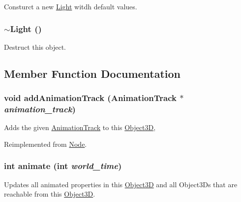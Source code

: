 Consturct a new \hyperlink{classm3g_1_1Light}{Light} witdh default values. \hypertarget{classm3g_1_1Light_f50d3d8cdb323e1a9fbd7bfac3aeba06}{
\subsubsection[{$\sim$Light}]{\setlength{\rightskip}{0pt plus 5cm}$\sim${\bf Light} ()}}
\label{classm3g_1_1Light_f50d3d8cdb323e1a9fbd7bfac3aeba06}


Destruct this object. 

\subsection{Member Function Documentation}
\hypertarget{classm3g_1_1Light_415c0b110f95410ded9b85e5d99a496b}{
\subsubsection[{addAnimationTrack}]{\setlength{\rightskip}{0pt plus 5cm}void addAnimationTrack ({\bf AnimationTrack} $\ast$ {\em animation\_\-track})}}
\label{classm3g_1_1Light_415c0b110f95410ded9b85e5d99a496b}


Adds the given \hyperlink{classm3g_1_1AnimationTrack}{AnimationTrack} to this \hyperlink{classm3g_1_1Object3D}{Object3D}, 

Reimplemented from \hyperlink{classm3g_1_1Node_415c0b110f95410ded9b85e5d99a496b}{Node}.\hypertarget{classm3g_1_1Light_8aad1ceab4c2a03609c8a42324ce484d}{
\subsubsection[{animate}]{\setlength{\rightskip}{0pt plus 5cm}int animate (int {\em world\_\-time})}}
\label{classm3g_1_1Light_8aad1ceab4c2a03609c8a42324ce484d}


Updates all animated properties in this \hyperlink{classm3g_1_1Object3D}{Object3D} and all Object3Ds that are reachable from this \hyperlink{classm3g_1_1Object3D}{Object3D}. 

